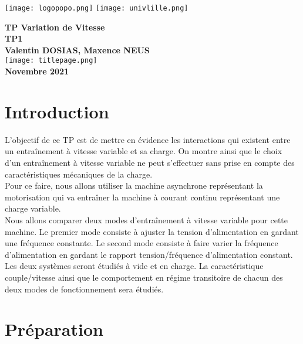 \documentclass[oneside,a4paper,12pt]{article}
\begin{document}
	\begin{titlepage}
		\texttt{[image: logopopo.png]}
		\hspace*{\fill}
		\texttt{[image: univlille.png]}
		
		\begin{center}
			\vspace{1cm}
			\textbf{TP Variation de Vitesse}\\
			\textbf{TP1 }\\
			\vspace{1cm}
			\textbf{Valentin DOSIAS, Maxence NEUS}\\
			\vspace{3cm}
			\texttt{[image: titlepage.png]}\\
			\vspace{\fill}
			\textbf{Novembre 2021}\\
		\end{center}
	\end{titlepage}
	
	\tableofcontents
	\newpage
	
	\section{Introduction}
	
	L’objectif de ce TP est de mettre en évidence les interactions qui existent entre un entraînement à vitesse variable et sa charge. On montre ainsi que le choix d’un entraînement à vitesse variable ne peut s’effectuer sans prise en compte des caractéristiques mécaniques de la charge.\\
	Pour ce faire, nous allons utiliser la machine asynchrone représentant la motorisation qui va entraîner la machine à courant continu représentant une charge variable.\\
	Nous allons comparer deux modes d'entraînement à vitesse variable pour cette machine. Le premier mode consiste à ajuster la tension d’alimentation en gardant une fréquence constante. Le second mode consiste à faire varier la fréquence d’alimentation en gardant le rapport tension/fréquence d’alimentation constant. Les deux systèmes seront étudiés à vide et en charge. La caractéristique couple/vitesse ainsi que le comportement en régime transitoire de chacun des deux modes de fonctionnement sera étudiés.\\
	
	\section{Préparation}
	
\end{document}
